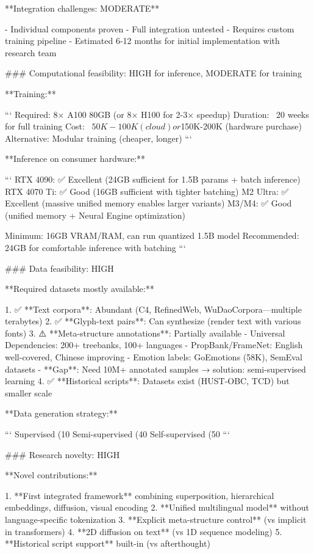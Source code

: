 \documentclass[11pt]{article}
\begin{document}
**Integration challenges: MODERATE**

- Individual components proven
- Full integration untested
- Requires custom training pipeline
- Estimated 6-12 months for initial implementation with research team

### Computational feasibility: HIGH for inference, MODERATE for training

**Training:**

```
Required: 8× A100 80GB (or 8× H100 for 2-3× speedup)
Duration: ~20 weeks for full training
Cost: ~$50K-100K (cloud) or $150K-200K (hardware purchase)
Alternative: Modular training (cheaper, longer)
```

**Inference on consumer hardware:**

```
RTX 4090: ✅ Excellent (24GB sufficient for 1.5B params + batch inference)
RTX 4070 Ti: ✅ Good (16GB sufficient with tighter batching)
M2 Ultra: ✅ Excellent (massive unified memory enables larger variants)
M3/M4: ✅ Good (unified memory + Neural Engine optimization)

Minimum: 16GB VRAM/RAM, can run quantized 1.5B model
Recommended: 24GB for comfortable inference with batching
```

### Data feasibility: HIGH

**Required datasets mostly available:**

1. ✅ **Text corpora**: Abundant (C4, RefinedWeb, WuDaoCorpora—multiple terabytes)
2. ✅ **Glyph-text pairs**: Can synthesize (render text with various fonts)
3. ⚠️ **Meta-structure annotations**: Partially available
   - Universal Dependencies: 200+ treebanks, 100+ languages
   - PropBank/FrameNet: English well-covered, Chinese improving
   - Emotion labels: GoEmotions (58K), SemEval datasets
   - **Gap**: Need 10M+ annotated samples → solution: semi-supervised learning
4. ✅ **Historical scripts**: Datasets exist (HUST-OBC, TCD) but smaller scale

**Data generation strategy:**

```
Supervised (10%
Semi-supervised (40%
Self-supervised (50%
```

### Research novelty: HIGH

**Novel contributions:**

1. **First integrated framework** combining superposition, hierarchical embeddings, diffusion, visual encoding
2. **Unified multilingual model** without language-specific tokenization
3. **Explicit meta-structure control** (vs implicit in transformers)
4. **2D diffusion on text** (vs 1D sequence modeling)
5. **Historical script support** built-in (vs afterthought)
\end{document}

